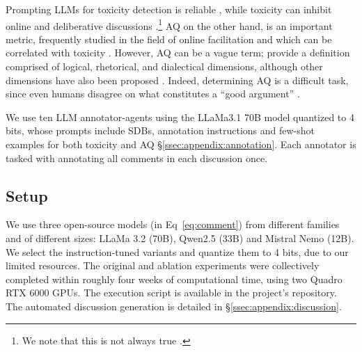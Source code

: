 Prompting \acp{LLM} for toxicity detection is reliable \citep{kang-qian-2024-implanting, Wang2022ToxicityDW, anjum2024hate}, while toxicity can inhibit online and deliberative discussions \citep{dekock2022disagree, XiaToxicity}.\footnote{We note that this is not always true \citep{Avalle2024PersistentIP}.} \ac{AQ} on the other hand, is an important metric, frequently studied in the field of online facilitation \cite{argyle2023, schroeder-etal-2024-fora, falk-etal-2024-moderation, falk-etal-2021-predicting} and which can be correlated with toxicity \cite{chang-danescu-niculescu-mizil-2019-trouble}. However, \ac{AQ} can be a vague term; \citet{wachsmuth-etal-2017-computational} provide a definition comprised of logical, rhetorical, and dialectical dimensions, although other dimensions have also been proposed \cite{habernal-gurevych-2016-argument, persing-ng-2015-modeling}. Indeed, determining \ac{AQ} is a difficult task, since even humans disagree on what constitutes a ``good argument” \cite{wachsmuth-etal-2017-computational, argyle2023}. 

We use ten \ac{LLM} annotator-agents using the LLaMa3.1 70B model quantized to 4 bits, whose prompts include \acp{SDB}, annotation instructions and few-shot examples for both toxicity and \ac{AQ} \S\ref{ssec:appendix:annotation}. Each annotator is tasked with annotating all comments in each discussion once.


\subsection{Setup}
\label{ssec:experimental:setup}

We use three open-source models (in Eq~\ref{eq:comment}) from different families and of different sizes: LLaMa 3.2 (70B), Qwen2.5 (33B) and Mistral Nemo (12B). We select the instruction-tuned variants and quantize them to 4 bits, due to our limited resources. The original and ablation experiments were collectively completed within roughly four weeks of computational time, using two Quadro RTX 6000 GPUs. The execution script is available in the project's repository\analysislink. The automated discussion generation is detailed in \S\ref{ssec:appendix:discussion}.

